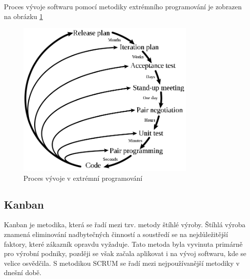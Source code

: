 \documentclass[czech,DP]{thesiskiv}
\begin{document}
Proces vývoje softwaru pomocí metodiky extrémního programování je zobrazen na obrázku \ref{img:XP}
\begin{figure}[!htb]
    \centering
    \includegraphics[width=250pt]{img/extremeprogramming.png}
    \caption{Proces vývoje v extrémní programování \cite{metodiky}}
    \label{img:XP}
\end{figure}
\FloatBarrier
\subsection{Kanban}
Kanban je metodika, která se řadí mezi tzv. metody štíhlé výroby. Štíhlá výroba znamená eliminování nadbytečných činností a soustředí se na nejdůležitější faktory, které zákazník opravdu vyžaduje. Tato metoda byla vyvinuta primárně pro výrobní podniky, později se však začala aplikovat i na vývoj softwaru, kde se velice osvědčila. S metodikou SCRUM se řadí mezi nejpoužívanější metodiky v dnešní době.\cite{metodiky}
\end{document}

